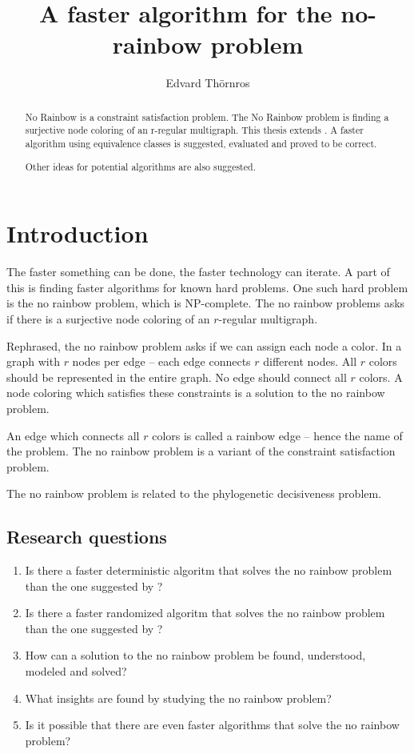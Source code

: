 \documentclass{article}
\title{A faster algorithm for the no-rainbow problem}
\author{Edvard Thörnros}
\begin{document}
\maketitle

\begin{abstract}

No Rainbow is a constraint satisfaction problem.
The No Rainbow problem is finding a surjective node coloring of an r-regular multigraph.
This thesis extends \cite{sourceNoRainbow}.
A faster algorithm using equivalence classes is suggested, evaluated and proved to be correct.

Other ideas for potential algorithms are also suggested.

\end{abstract}

\section{Introduction}
The faster something can be done, the faster technology can iterate.
A part of this is finding faster algorithms for known hard problems.
One such hard problem is the no rainbow problem, which is NP-complete\cite{sourceNoRainbow}.
The no rainbow problems asks if there is a surjective node coloring of an $r$-regular multigraph.

Rephrased, the no rainbow problem asks if we can assign each node a color.
In a graph with $r$ nodes per edge -- each edge connects $r$ different nodes.
All $r$ colors should be represented in the entire graph.
No edge should connect all $r$ colors.
A node coloring which satisfies these constraints is a solution to the no rainbow problem.

An edge which connects all $r$ colors is called a rainbow edge -- hence the name of the problem.
The no rainbow problem is a variant of the constraint satisfaction problem.

The no rainbow problem is related to the phylogenetic decisiveness problem. \cite{sourcePhylogeneticDecisiveness}


\subsection{Research questions}
\begin{enumerate}
  \item Is there a faster deterministic algoritm that solves the no rainbow problem than the one suggested by \cite{sourceNoRainbow}?
  \item Is there a faster randomized algoritm that solves the no rainbow problem than the one suggested by \cite{sourceNoRainbow}?
  \item How can a solution to the no rainbow problem be found, understood, modeled and solved?
  \item What insights are found by studying the no rainbow problem?
  \item Is it possible that there are even faster algorithms that solve the no rainbow problem?
\end{enumerate}
\end{document}
